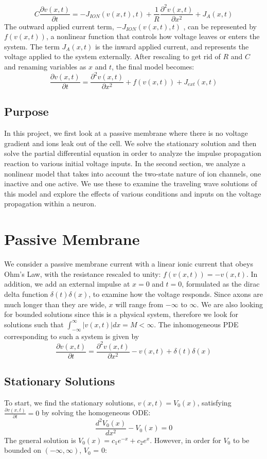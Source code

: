 \documentclass[12pt]{article}
\begin{document}
\[C\frac{\partial{v(x,t)}}{\partial{t}}=-J_{ION}(v(x,t),t)+\frac{1}{R}\frac{\partial^2{v(x,t)}}{\partial{x}^2}+J_A(x,t)\]
The outward applied current term, $-J_{ION}(v(x,t),t)$ , can be represented by $f(v(x,t))$, a nonlinear function that controls how voltage leaves or enters the system. The term $J_A(x,t)$ is the inward applied current, and represents the voltage applied to the system externally. After rescaling to get rid of $R$ and $C$ and renaming variables as $x$ and $t$, the final model becomes:
\[\frac{\partial{v(x,t)}}{\partial{t}}=\frac{\partial^2{v(x,t)}}{\partial{x}^2}+f(v(x,t))+J_{ext}(x,t)\]

\subsection{Purpose}
In this project, we first look at a passive membrane where there is no voltage gradient and ions leak out of the cell. We solve the stationary solution and then solve the partial differential equation in order to analyze the impulse propagation reaction to various initial voltage inputs. In the second section, we analyze a nonlinear model that takes into account the two-state nature of ion channels, one inactive and one active. We use these to examine the traveling wave solutions of this model and explore the effects of various conditions and inputs on the voltage propagation within a neuron.
\section{Passive Membrane}
We consider a passive membrane current with a linear ionic current that obeys Ohm's Law, with the resistance rescaled to unity: $f(v(x,t)) = -v(x,t)$. In addition, we add an external impulse at $x=0$ and $t=0$, formulated as the dirac delta function $\delta(t) \delta(x)$, to examine how the voltage responds. Since axons are much longer than they are wide, $x$ will range from $-\infty$ to $\infty$. We are also looking for bounded solutions since this is a physical system, therefore we look for solutions such that $\int_{-\infty}^{\infty}|v(x,t)|dx = M < \infty$. The inhomogeneous PDE corresponding to such a system is given by
\begin{equation} \label{pm}
\frac{\partial{v(x,t)}}{\partial{t}}=\frac{\partial^2{v(x,t)}}{\partial{x}^2}-v(x,t)+\delta(t)\delta(x)
\end {equation}

\subsection{Stationary Solutions}
To start, we find the stationary solutions, $v(x,t) = V_0(x)$, satisfying $\frac{\partial{v(x,t)}}{\partial{t}} = 0$ by solving the homogeneous ODE:
\begin{equation} \label{pm_odeH}
\frac{d^2{V_0(x)}}{d{x^2}} - V_0(x) = 0
\end{equation}
The general solution is $V_0(x) = c_1e^{-x} + c_2e^{x}$. However, in order for $V_0$ to be bounded on $(-\infty, \infty)$, $V_0$ = 0:
\end{document}
